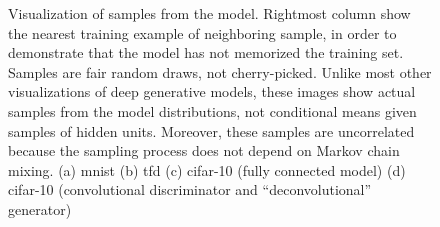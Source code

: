 \begin{figure}[htb]
	\centering
	\caption{Visualization of samples from the model. Rightmost column show the nearest training example of neighboring sample, in order to demonstrate that the model has not memorized the training set. Samples are fair random draws, not cherry-picked. Unlike most other visualizations of deep generative models, these images show actual samples from the model distributions, not conditional means given samples of hidden units. Moreover, these samples are uncorrelated because the sampling process does not depend on Markov chain mixing. (a) \acrshort{mnist} (b) \acrshort{tfd} (c) \acrshort{cifar-10} (fully connected model) (d) \acrshort{cifar-10} (convolutional discriminator and ``deconvolutional'' generator)}
	\label{fig: figure 2}
\end{figure}

